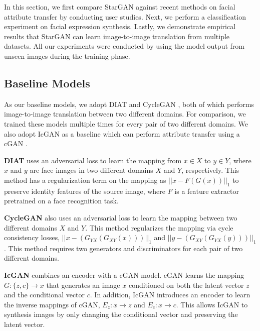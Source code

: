 \documentclass[10pt,twocolumn,letterpaper]{article}
\begin{document}
In this section, we first compare StarGAN against recent methods on facial attribute transfer by conducting user studies. Next, we perform a classification experiment on facial expression synthesis. Lastly, we demonstrate empirical results that StarGAN can learn image-to-image translation from multiple datasets. All our experiments were conducted by using the model output from unseen images during the training phase. 


\subsection{Baseline Models}
As our baseline models, we adopt DIAT \cite{li2016deep} and CycleGAN \cite{zhu2017unpaired}, both of which performs image-to-image translation between two different domains. For comparison, we trained these models multiple times for every pair of two different domains. We also adopt IcGAN \cite{perarnau2016invertible} as a baseline which can perform attribute transfer using a cGAN \cite{odena2016conditional}. 

\medskip

\noindent \textbf{DIAT} uses an adversarial loss to learn the mapping from $x \in X$ to $y \in Y$, where $x$ and $y$ are face images in two different domains $X$ and $Y$, respectively. This method has a regularization term on the mapping as ${||x - F(G(x))||}_{1} $ to preserve identity features of the source image, where $F$ is a feature extractor pretrained on a face recognition task. 

\medskip

\noindent \textbf{CycleGAN} also uses an adversarial loss to learn the mapping between two different domains $X$ and $Y$. This method regularizes the mapping via cycle consistency losses, ${||x - ({G}_{YX}({G}_{XY}(x)))||}_{1} $ and ${||y - ({G}_{XY}({G}_{YX}(y)))||}_{1}$. This method requires two generators and discriminators for each pair of two different domains.
\medskip

\noindent \textbf{IcGAN} combines an encoder with a cGAN \cite{odena2016conditional} model. cGAN learns the mapping $G: \{z, c\} \rightarrow x$ that generates an image $x$ conditioned on both the latent vector $z$ and the conditional vector $c$. In addition, IcGAN introduces an encoder to learn the inverse mappings of cGAN, ${E}_{z}: x \rightarrow z$ and ${E}_{c}: x \rightarrow c$. This allows IcGAN to synthesis images by only changing the conditional vector and preserving the latent vector.
\end{document}
